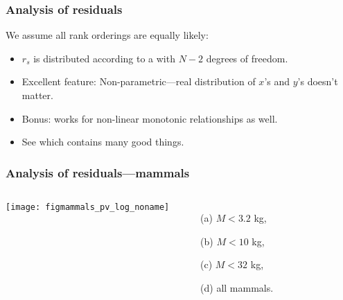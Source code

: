\begin{frame}
  \frametitle{Analysis of residuals}

  \begin{block}{We assume all rank orderings are equally likely:}
    \begin{itemize}
    \item<2->
      $r_s$ is distributed according to a
      with $N-2$ degrees of freedom.
    \item<3->
      Excellent feature: Non-parametric---real distribution
      of $x$'s and $y$'s doesn't matter.
    \item<4->
      Bonus: works for non-linear monotonic relationships as well.
    \item<5->
      See  
      which contains many good things.\cite{press1992a}
    \end{itemize}
  \end{block}

\end{frame}

\begin{frame}
  \frametitle{Analysis of residuals---mammals}

  \begin{block}{}
    \begin{columns}
      \texttt{[image: figmammals\_pv\_log\_noname]}
      \begin{enumerate}
      \item[(a)] 
        $M<3.2$ kg,
      \item[(b)]
        $M<10$ kg,
      \item[(c)] 
        $M<32$ kg, 
      \item[(d)] 
        all mammals.
      \end{enumerate}
    \end{columns}
  \end{block}



\end{frame}

